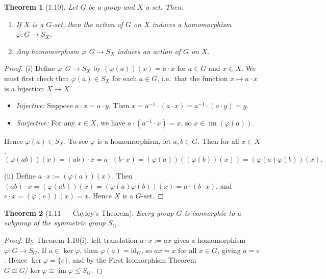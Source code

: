 \documentclass[12pt]{article}
\newtheorem{theorem}{Theorem}
\begin{document}
\begin{theorem}[1.10]
Let $G$ be a group and $X$ a set. Then:
\begin{enumerate}[label=(\roman*)]
  \item If $X$ is a $G$-set, then the action of $G$ on $X$ induces a homomorphism $\varphi : G \to S_X$;
  \item Any homomorphism $\varphi : G \to S_X$ induces an action of $G$ on $X$.
\end{enumerate}
\end{theorem}

\begin{proof}
(i) Define $\varphi : G \to S_X$ by $(\varphi(a))(x) = a \cdot x$ for $a \in G$ and $x \in X$.
We must first check that $\varphi(a) \in S_X$ for each $a \in G$, i.e.\ that the function $x \mapsto a \cdot x$ is a bijection $X \to X$.
\begin{itemize}
  \item \textit{Injective:} Suppose $a \cdot x = a \cdot y$. Then $x = a^{-1} \cdot (a \cdot x) = a^{-1} \cdot (a \cdot y) = y$.
  \item \textit{Surjective:} For any $x \in X$, we have $a \cdot (a^{-1} \cdot x) = x$, so $x \in \operatorname{im}(\varphi(a))$.
\end{itemize}
Hence $\varphi(a) \in S_X$. To see $\varphi$ is a homomorphism, let $a, b \in G$. Then for all $x \in X$,
\[
  (\varphi(ab))(x) = (ab) \cdot x = a \cdot (b \cdot x) = (\varphi(a))((\varphi(b))(x)) = (\varphi(a)\varphi(b))(x).
\]

(ii) Define $a \cdot x := (\varphi(a))(x)$. Then $(ab) \cdot x = (\varphi(ab))(x) = (\varphi(a)\varphi(b))(x) = a \cdot (b \cdot x)$, and $e \cdot x = (\varphi(e))(x) = x$. Hence $X$ is a $G$-set.
\end{proof}


\begin{theorem}[1.11 — Cayley's Theorem]
Every group $G$ is isomorphic to a subgroup of the symmetric group $S_G$.
\end{theorem}

\begin{proof}
By Theorem 1.10(i), left translation $a \cdot x := ax$ gives a homomorphism $\varphi : G \to S_G$.
If $a \in \ker\varphi$, then $\varphi(a) = \mathrm{id}_G$, so $ax = x$ for all $x \in G$, giving $a = e$.
Hence $\ker\varphi = \{e\}$, and by the First Isomorphism Theorem $G \cong G/\ker\varphi \cong \operatorname{im}\varphi \leq S_G$.
\end{proof}
\end{document}
